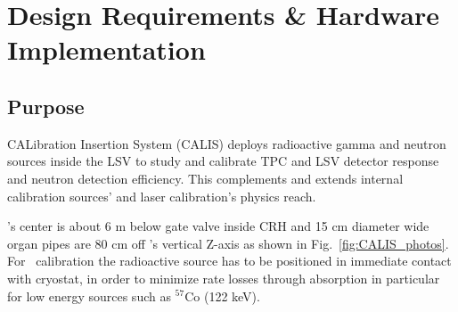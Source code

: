 \section{Design Requirements \& Hardware Implementation} \label{sec:hardware}\label{sec:design_requirements}

\subsection{Purpose}
CALibration Insertion System (CALIS) deploys radioactive gamma and neutron sources inside the LSV to study and calibrate TPC and LSV detector response and neutron detection efficiency. This complements and extends internal calibration sources' and laser calibration's physics reach. 

\lsv's center is about 6 m below gate valve inside CRH
 and 15 cm diameter wide organ pipes are 80 cm off \tpc's vertical Z-axis as shown in Fig.~\ref{fig:CALIS_photos}. For \tpc\ calibration the radioactive source has to be positioned in immediate contact with cryostat, in order to minimize rate losses through absorption in particular for low energy sources such as $^{57}$Co (122 keV). 

